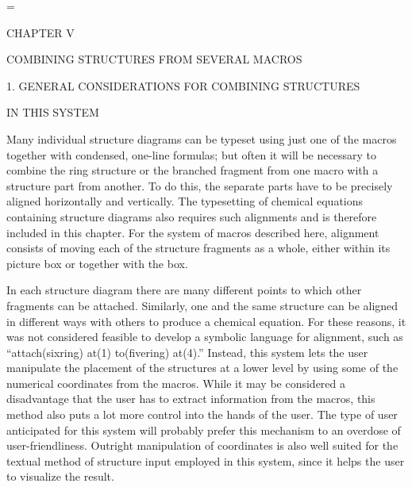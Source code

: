
  \nofiles                          
  \def\LATEX{\LaTeX}
  \let\TEX = \TeX               
  \setcounter{totalnumber}{5}   
  \setcounter{topnumber}{3}     
  \setcounter{bottomnumber}{3}
  \setlength{\oddsidemargin}{3.9cm}     %
  \setlength{\textwidth}{5.7in}         %
  \setlength{\topmargin}{1cm}
  \setlength{\headheight}{.6cm}
  \setlength{\textheight}{8.5in}
  \setlength{\parindent}{1cm}
  \renewcommand{\baselinestretch}{1.5}
  \raggedbottom
  
  
  
  
  
  
  
  
  
  
      
  \setcounter{page}{35}
  \setcounter{chapter}{5}
  =\tenrm
  \initial

 \centerline{CHAPTER V}
 \vspace{\len mm}
 \centerline{COMBINING STRUCTURES FROM SEVERAL MACROS}
 \vspace{\len mm}
 \centerline{1. GENERAL CONSIDERATIONS FOR COMBINING STRUCTURES}
 \centerline{IN THIS SYSTEM}
 \vspace{\len mm}
 Many individual
 structure diagrams can be typeset using just one of the macros
 together with condensed, one-line formulas; but often it will be
 necessary to combine the ring structure or the branched fragment
 from one macro with a structure part from another. To do this,
 the separate parts have to be precisely aligned horizontally and
 vertically. The typesetting of chemical equations containing
 structure diagrams also requires such alignments and is therefore
 included in this chapter.
 For the system of macros described here, alignment consists of moving
 each of the structure fragments as a whole, either within its 
 picture box or together with the box.
  
 In each structure diagram there are many different points to which
 other fragments can be attached. Similarly, one and the same   
 structure can be aligned in different ways with others to produce
 a chemical equation. For these reasons, it was not considered
 feasible to develop a symbolic language for alignment, such as
 ``attach(sixring) at(1) to(fivering) at(4).'' Instead, this
 system lets the user manipulate the placement of the structures
 at a lower level by using some of the numerical coordinates from
 the macros. While it may be considered a disadvantage that the
 user has to extract information from the macros, this method also
 puts a lot more control into the hands of the user. The type of
 user anticipated for this system will probably prefer this
 mechanism to an overdose of user-friendliness. Outright manipulation
 of coordinates is also well suited for the textual method of
 structure input employed in this system, since it helps the user
 to visualize the result.

